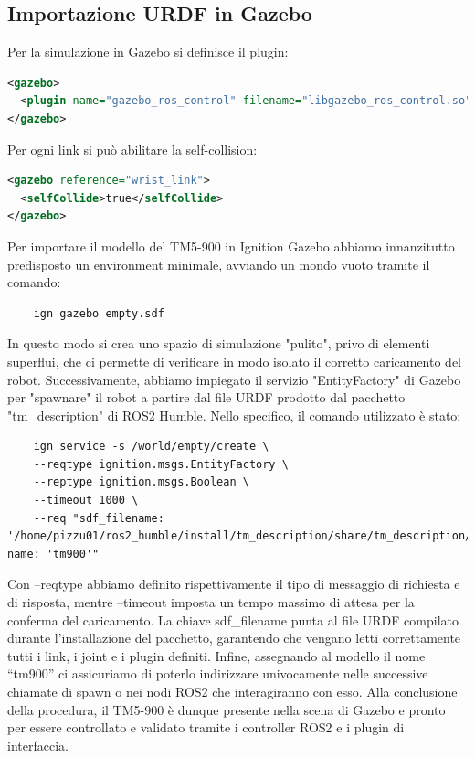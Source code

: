 \documentclass[11pt]{report}
\begin{document}
\subsection{Importazione URDF in Gazebo}
Per la simulazione in Gazebo si definisce il plugin:

\begin{lstlisting}[language=xml]
<gazebo>
  <plugin name="gazebo_ros_control" filename="libgazebo_ros_control.so"/>
</gazebo>
\end{lstlisting}
\vspace{1em}
Per ogni link si può abilitare la self-collision:

\begin{lstlisting}[language=xml]
<gazebo reference="wrist_link">
  <selfCollide>true</selfCollide>
</gazebo>
\end{lstlisting}
\vspace{1em}

Per importare il modello del TM5-900 in Ignition Gazebo abbiamo innanzitutto predisposto un environment minimale, avviando un mondo vuoto tramite il comando:  
\begin{verbatim}
    ign gazebo empty.sdf
\end{verbatim}
In questo modo si crea uno spazio di simulazione "pulito", privo di elementi superflui, che ci permette di verificare in modo isolato il corretto caricamento del robot. Successivamente, abbiamo impiegato il servizio "EntityFactory" di Gazebo per "spawnare" il robot a partire dal file URDF prodotto dal pacchetto "tm\_description" di ROS2 Humble. Nello specifico, il comando utilizzato è stato:  
\begin{verbatim}
    ign service -s /world/empty/create \
    --reqtype ignition.msgs.EntityFactory \
    --reptype ignition.msgs.Boolean \
    --timeout 1000 \
    --req "sdf_filename: '/home/pizzu01/ros2_humble/install/tm_description/share/tm_description/urdf/tm900_robot_prova2.urdf', name: 'tm900'"
\end{verbatim}

Con --reqtype abbiamo definito rispettivamente il tipo di messaggio di richiesta e di risposta, mentre --timeout imposta un tempo massimo di attesa per la conferma del caricamento. La chiave sdf\_filename punta al file URDF compilato durante l’installazione del pacchetto, garantendo che vengano letti correttamente tutti i link, i joint e i plugin definiti. Infine, assegnando al modello il nome “tm900” ci assicuriamo di poterlo indirizzare univocamente nelle successive chiamate di spawn o nei nodi ROS2 che interagiranno con esso. Alla conclusione della procedura, il TM5-900 è dunque presente nella scena di Gazebo e pronto per essere controllato e validato tramite i controller ROS2 e i plugin di interfaccia.
\end{document}

